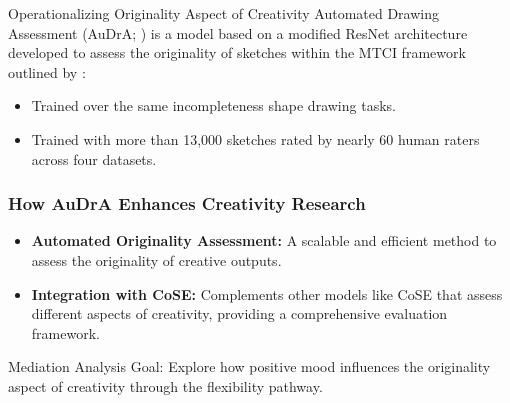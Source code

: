 \documentclass[pdf]{beamer}
\begin{document}
\begin{frame}{Operationalizing Originality Aspect of Creativity}
Automated Drawing Assessment (\alert{AuDrA}; \cite{patterson_audra_2023}) is a model based on a modified ResNet architecture developed to assess the originality of sketches within the MTCI framework outlined by \textcite{barbot_dynamics_2018}:
\vspace{1em}
\begin{itemize}
    \item Trained over the same incompleteness shape drawing tasks.
    \item Trained with more than 13,000 sketches rated by nearly 60 human raters across four datasets.
\end{itemize}
\end{frame}

\begin{frame}
\frametitle{How AuDrA Enhances Creativity Research}
\begin{itemize}
    \item<1-> \textbf{Automated Originality Assessment:} A scalable and efficient method to assess the originality of creative outputs.
    \vspace{1em}
    \item<2-> \textbf{Integration with CoSE:} Complements other models like CoSE that assess different aspects of creativity, providing a comprehensive evaluation framework.
\end{itemize}
\end{frame}

\begin{frame}{Mediation Analysis}
\alert{Goal}: Explore how positive mood influences the originality aspect of creativity through the flexibility pathway.
\end{frame}
\end{document}
